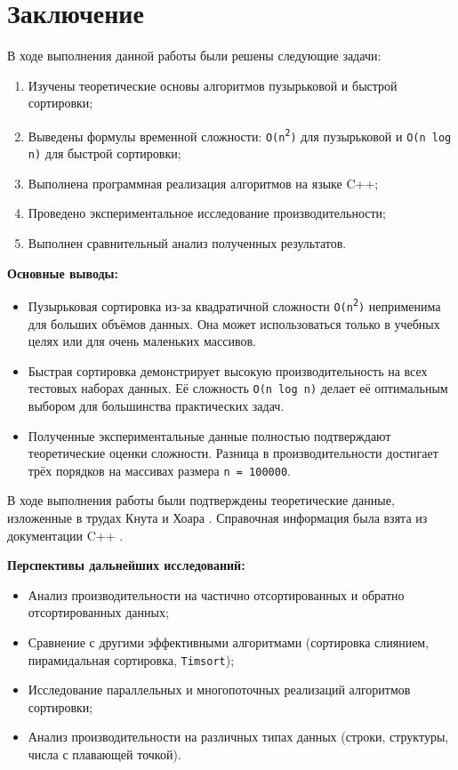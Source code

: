 \section{Заключение}

В ходе выполнения данной работы были решены следующие задачи:

\begin{enumerate}
    \item Изучены теоретические основы алгоритмов пузырьковой и быстрой сортировки;
    \item Выведены формулы временной сложности: \texttt{O(n\textsuperscript{2})} для пузырьковой и \texttt{O(n log n)} для быстрой сортировки;
    \item Выполнена программная реализация алгоритмов на языке C++;
    \item Проведено экспериментальное исследование производительности;
    \item Выполнен сравнительный анализ полученных результатов.
\end{enumerate}

\textbf{Основные выводы:}

\begin{itemize}
    \item Пузырьковая сортировка из-за квадратичной сложности \texttt{O(n\textsuperscript{2})} неприменима для больших объёмов данных. Она может использоваться только в учебных целях или для очень маленьких массивов.
    
    \item Быстрая сортировка демонстрирует высокую производительность на всех тестовых наборах данных. Её сложность \texttt{O(n log n)} делает её оптимальным выбором для большинства практических задач.
    
    \item Полученные экспериментальные данные полностью подтверждают теоретические оценки сложности. Разница в производительности достигает трёх порядков на массивах размера \texttt{n = 100000}.
\end{itemize}

В ходе выполнения работы были подтверждены теоретические данные, изложенные в трудах Кнута \cite{knuth1998art} и Хоара \cite{hoare1962quicksort}. Справочная информация была взята из документации C++ \cite{cppreference}.

\textbf{Перспективы дальнейших исследований:}

\begin{itemize}
    \item Анализ производительности на частично отсортированных и обратно отсортированных данных;
    \item Сравнение с другими эффективными алгоритмами (сортировка слиянием, пирамидальная сортировка, \texttt{Timsort});
    \item Исследование параллельных и многопоточных реализаций алгоритмов сортировки;
    \item Анализ производительности на различных типах данных (строки, структуры, числа с плавающей точкой).
\end{itemize}